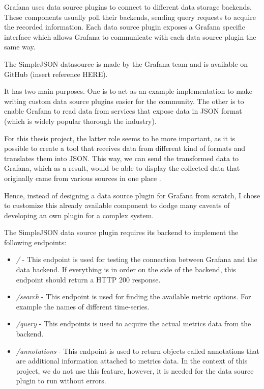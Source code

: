 Grafana uses data source plugins to connect to different data storage backends. These components usually poll their backends, sending query requests to acquire the recorded information. Each data source plugin exposes a Grafana specific interface which allows Grafana to communicate with each data source plugin the same way.

The SimpleJSON datasource is made by the Grafana team and is available on GitHub (insert reference HERE).

It has two main purposes. One is to act as an example implementation to make writing custom data source plugins easier for the community. The other is to enable Grafana to read data from services that expose data in JSON format (which is widely popular thorough the industry).

For this thesis project, the latter role seems to be more important, as it is possible to create a tool that receives data from different kind of formats and translates them into JSON. This way, we can send the transformed data to Grafana, which as a result, would be able to display the collected data that originally came from various sources in one place .

Hence, instead of designing a data source plugin for Grafana from scratch, I chose to customize this already available component to dodge many caveats of developing an own plugin for a complex system.

The SimpleJSON data source plugin requires its backend to implement the following endpoints:

\begin{itemize}
	\item \emph{/} - This endpoint is used for testing the connection between Grafana and the data backend. If everything is in order on the side of the backend, this endpoint should return a HTTP 200 response.
	\item \emph{/search} - This endpoint is used for finding the available metric options. For example the names of different time-series.
	\item \emph{/query} - This endpoints is used to acquire the actual metrics data from the backend.
	\item \emph{/annotations} - This endpoint is used to return objects called annotations that are additional information attached to metrics data. In the context of this project, we do not use this feature, however, it is needed for the data source plugin to run without errors.
\end{itemize}

